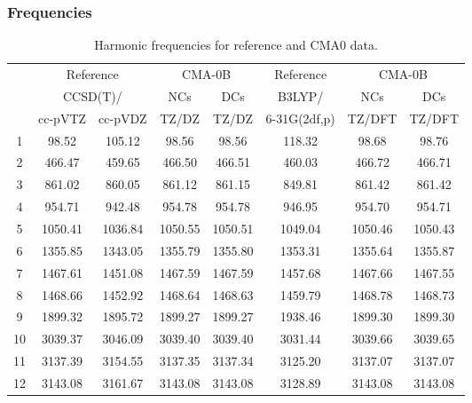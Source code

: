 \documentclass[10pt,oneside]{article}
\begin{document}
\subsubsection*{Frequencies}
\begin{table}[h!]
\centering
\caption{Harmonic frequencies for reference and CMA0 data.}
\begin{tabular}{cccccccc}
\toprule
{} & \multicolumn{2}{c}{Reference} & \multicolumn{2}{c}{CMA-0B} &    Reference & \multicolumn{2}{c}{CMA-0B} \\
{} & \multicolumn{2}{c}{CCSD(T)/} &     NCs &     DCs &       B3LYP/ &     NCs &     DCs \\
{} &   cc-pVTZ & cc-pVDZ &   TZ/DZ &   TZ/DZ & 6-31G(2df,p) &  TZ/DFT &  TZ/DFT \\
\midrule
1  &     98.52 &  105.12 &   98.56 &   98.56 &       118.32 &   98.68 &   98.76 \\
2  &    466.47 &  459.65 &  466.50 &  466.51 &       460.03 &  466.72 &  466.71 \\
3  &    861.02 &  860.05 &  861.12 &  861.15 &       849.81 &  861.42 &  861.42 \\
4  &    954.71 &  942.48 &  954.78 &  954.78 &       946.95 &  954.70 &  954.71 \\
5  &   1050.41 & 1036.84 & 1050.55 & 1050.51 &      1049.04 & 1050.46 & 1050.43 \\
6  &   1355.85 & 1343.05 & 1355.79 & 1355.80 &      1353.31 & 1355.64 & 1355.87 \\
7  &   1467.61 & 1451.08 & 1467.59 & 1467.59 &      1457.68 & 1467.66 & 1467.55 \\
8  &   1468.66 & 1452.92 & 1468.64 & 1468.63 &      1459.79 & 1468.78 & 1468.73 \\
9  &   1899.32 & 1895.72 & 1899.27 & 1899.27 &      1938.46 & 1899.30 & 1899.30 \\
10 &   3039.37 & 3046.09 & 3039.40 & 3039.40 &      3031.44 & 3039.66 & 3039.65 \\
11 &   3137.39 & 3154.55 & 3137.35 & 3137.34 &      3125.20 & 3137.07 & 3137.07 \\
12 &   3143.08 & 3161.67 & 3143.08 & 3143.08 &      3128.89 & 3143.08 & 3143.08 \\
\bottomrule
\end{tabular}
\end{table}

\clearpage
\end{document}
